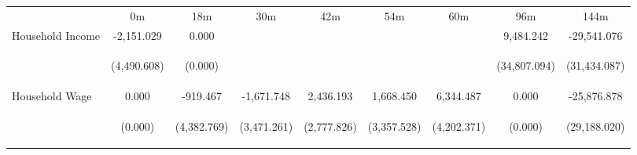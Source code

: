 \begin{tabular}{lcccccccc}
\hline \noalign{\smallskip} & 0m & 18m & 30m & 42m & 54m & 60m & 96m & 144m\\
\noalign{\smallskip}\hline \noalign{\smallskip}Household Income & -2,151.029 & 0.000 &  &  &  &  & 9,484.242 & -29,541.076\\
 & \begin{footnotesize}(4,490.608)\end{footnotesize} & \begin{footnotesize}(0.000)\end{footnotesize} & \begin{footnotesize}\end{footnotesize} & \begin{footnotesize}\end{footnotesize} & \begin{footnotesize}\end{footnotesize} & \begin{footnotesize}\end{footnotesize} & \begin{footnotesize}(34,807.094)\end{footnotesize} & \begin{footnotesize}(31,434.087)\end{footnotesize}\\
\noalign{\smallskip}Household Wage & 0.000 & -919.467 & -1,671.748 & 2,436.193 & 1,668.450 & 6,344.487 & 0.000 & -25,876.878\\
 & \begin{footnotesize}(0.000)\end{footnotesize} & \begin{footnotesize}(4,382.769)\end{footnotesize} & \begin{footnotesize}(3,471.261)\end{footnotesize} & \begin{footnotesize}(2,777.826)\end{footnotesize} & \begin{footnotesize}(3,357.528)\end{footnotesize} & \begin{footnotesize}(4,202.371)\end{footnotesize} & \begin{footnotesize}(0.000)\end{footnotesize} & \begin{footnotesize}(29,188.020)\end{footnotesize}\\

\end{tabular}

